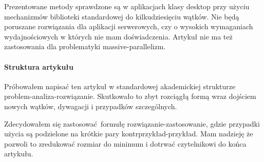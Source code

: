 Prezentowane metody sprawdzone są w aplikacjach klasy desktop przy użyciu mechanizmów biblioteki standardowej do kilkudziesięciu wątków. Nie będą poruszane rozwiązania dla aplikacji serwerowych, czy o wysokich wymaganiach wydajnościowych w których nie mam doświadczenia. Artykuł nie ma też zastosowania dla problematyki massive-parallelizm.

\paragraph{Struktura artykułu}
Próbowałem napisać ten artykuł w standardowej akademickiej strukturze problem-analiza-rozwiązanie. Skutkowało to zbyt rozciągłą formą wraz dojściem nowych wątków, dywagacji i przypadków szczególnych.

Zdecydowałem się zastosować formułę rozwiązanie-zastosowanie, gdzie przypadki użycia są podzielone na krótkie pary kontrprzykład-przykład. Mam nadzieję że pozwoli to zredukować rozmiar do minimum i dotrwać czytelnikowi do końca artykułu.
